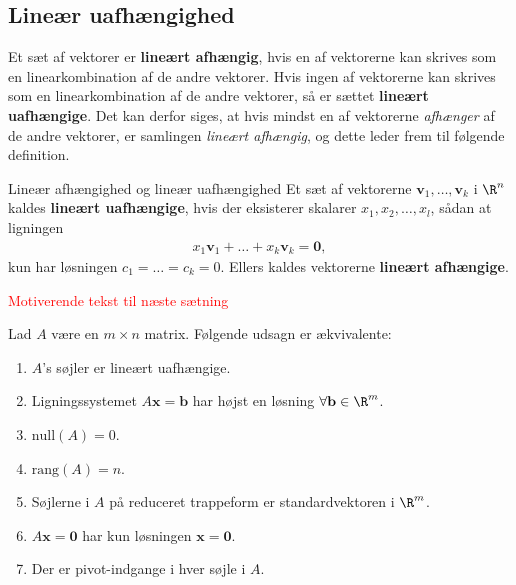 \subsection{Lineær uafhængighed}
Et sæt af vektorer er \textbf{lineært afhængig}, hvis en af vektorerne kan skrives som en linearkombination af de andre vektorer. Hvis ingen af vektorerne kan skrives som en linearkombination af de andre vektorer, så er sættet \textbf{lineært uafhængige}. Det kan derfor siges, at hvis mindst en af vektorerne \textit{afhænger} af de andre vektorer, er samlingen \textit{lineært afhængig}, og dette leder frem til følgende definition. 
% 
\begin{defn}{Lineær afhængighed og lineær uafhængighed}{}
Et sæt af vektorerne $\mathbf{v}_1, \ldots , \mathbf{v}_k$ i $\R^n$ kaldes \textbf{lineært uafhængige}, hvis der eksisterer skalarer $x_1,x_2, \ldots , x_l$, sådan at ligningen 
\begin{align*}
x_1\mathbf{v}_1 + \ldots + x_k \mathbf{v}_k = \mathbf{0}, 
\end{align*}
kun har løsningen $c_1 = \ldots = c_k = 0$.
Ellers kaldes vektorerne \textbf{lineært afhængige}.
\end{defn}
%
\begin{eks}

\end{eks}
% 
\textcolor{red}{Motiverende tekst til næste sætning}
%
\begin{thm}{}{}
%
Lad $A$ være en $m \times n$ matrix.
Følgende udsagn er ækvivalente:
%
\begin{enumerate}[label=(\alph*)]
\item $A$'s søjler er lineært uafhængige. 
\item Ligningssystemet $A\mathbf{x}=\mathbf{b}$ har højst en løsning $\forall \mathbf{b} \in \R^m$.
\item $\text{null}(A)=0$.
\item $\text{rang}(A)=n$.
\item Søjlerne i $A$ på reduceret trappeform er standardvektoren i $\R^m$.
\item $A\mathbf{x}=\mathbf{0}$ har kun løsningen $\mathbf{x}=\mathbf{0}$.
\item Der er pivot-indgange i hver søjle i $A$. 
\end{enumerate}
%
\end{thm}
%
